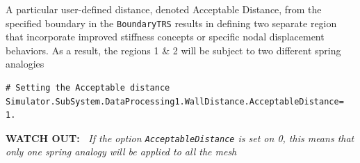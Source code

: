\documentclass[11pt]{article}
\begin{document}
A particular user-defined distance, denoted Acceptable Distance, from the specified boundary in the {\tt BoundaryTRS} results in defining two separate region that incorporate improved stiffness concepts or specific nodal displacement behaviors. As a result, the regions 1 \& 2 will be subject to two different spring analogies

\begin{lstlisting}[breaklines]
# Setting the Acceptable distance 
Simulator.SubSystem.DataProcessing1.WallDistance.AcceptableDistance= 1.
\end{lstlisting}

\begin{figure}[hbt!]
\end{figure}
{\bf WATCH OUT:~} {\it If the option {\tt AcceptableDistance} is set on 0, this means that only one spring analogy will be applied to all the mesh}
\end{document}

